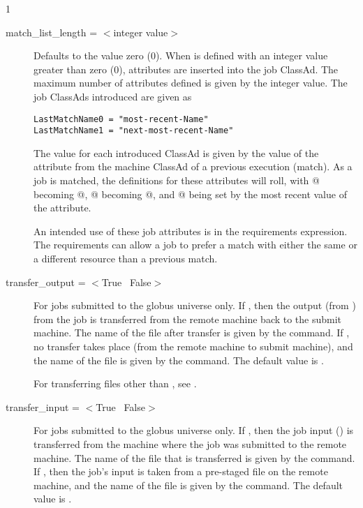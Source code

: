 \begin{ManPage}{\label{man-condor-submit}}{1}
\begin{description}

\item[match\_list\_length = $<$integer value$>$] 
Defaults to the value zero (0).
When  is defined with an integer value
greater than zero (0),
attributes are inserted into the job ClassAd.
The maximum number of attributes defined is given by the integer
value.
The job ClassAds introduced are given as
\begin{verbatim} 
LastMatchName0 = "most-recent-Name"
LastMatchName1 = "next-most-recent-Name"
\end{verbatim} 

The value for each introduced ClassAd is given by the
value of the  attribute 
from the machine ClassAd of a previous execution (match).
As a job is matched, the definitions for these attributes
will roll, 
with @ becoming @,
@ becoming @,
and @ being set by the most recent
value of the  attribute.

An intended use of 
these job attributes is in the requirements expression.
The requirements can allow a job to prefer a match with either the same
or a different resource than a previous match.

\item[transfer\_output = $<$True \Bar\ False$>$]
For jobs submitted to the globus universe only.
If , then the output (from ) from the job
is transferred from the remote machine back to the submit machine.
The name of the file after transfer is given
by the  command.
If , no transfer takes place (from the remote machine
to submit machine),
and the name of the file is given
by the  command.
The default value is .

For transferring files other than ,
see .

\item[transfer\_input = $<$True \Bar\ False$>$]
For jobs submitted to the globus universe only.
If , then the job input () is transferred
from the machine where the job was submitted to the remote machine.
The name of the file that is transferred is given by the
 command.
If , then the job's input is taken from a pre-staged
file on the remote machine, and
the name of the file is given by the  command.
The default value is .


\end{description}
\end{ManPage}
